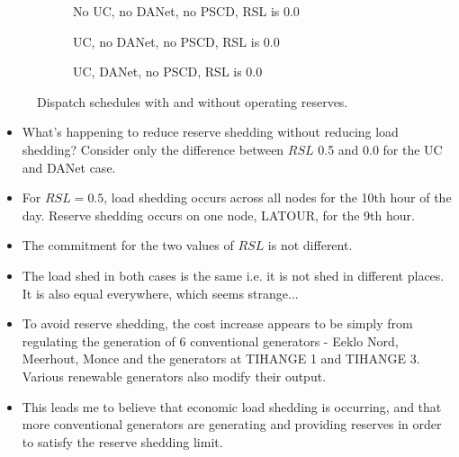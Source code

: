 \documentclass[number,times]{elsarticle}
\begin{document}
\begin{figure}[H]
    \centering
    \begin{subfigure}[t]{0.7\textwidth}
        \centering
        \caption{No UC, no DANet, no PSCD, RSL is 0.0}
    \end{subfigure}
    \begin{subfigure}[t]{0.7\textwidth}
        \centering
        \caption{UC, no DANet, no PSCD, RSL is 0.0}
    \end{subfigure}
    \begin{subfigure}[t]{0.7\textwidth}
        \centering
        \caption{UC, DANet, no PSCD, RSL is 0.0}
    \end{subfigure}
    \caption{Dispatch schedules with and without operating reserves.\label{fig:dispatch_simple_reserves}}
\end{figure}

\begin{itemize}
    \item What's happening to reduce reserve shedding without reducing load shedding? Consider only the difference between $RSL$ 0.5 and 0.0 for the UC and DANet case.
    \item For $RSL = 0.5 $, load shedding occurs across all nodes for the 10th hour of the day. Reserve shedding occurs on one node, LATOUR, for the 9th hour.
    \item The commitment for the two values of $RSL$ is not different.
    \item The load shed in both cases is the same i.e. it is not shed in different places. It is also equal everywhere, which seems strange...
    \item To avoid reserve shedding, the cost increase appears to be simply from regulating the generation of 6 conventional generators - Eeklo Nord, Meerhout, Monce and the generators at TIHANGE 1 and TIHANGE 3. Various renewable generators also modify their output.
    \item This leads me to believe that economic load shedding is occurring, and that more conventional generators are generating and providing reserves in order to satisfy the reserve shedding limit.
\end{itemize}
\end{document}
